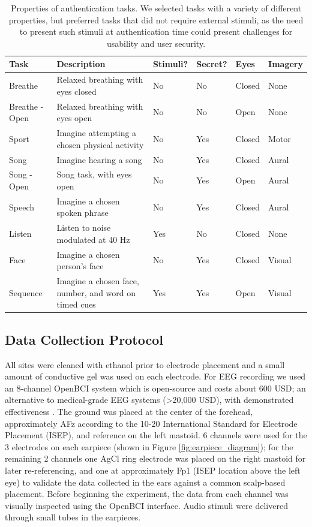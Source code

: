 \documentclass{sigchi}
\begin{document}
\begin{table}[t]
\centering
\begin{tabularx}{\textwidth}{llllll}

\textbf{Task} & \textbf{Description} & \textbf{Stimuli}? & \textbf{Secret}? & \textbf{Eyes} & \textbf{Imagery}\\
\hline
Breathe & Relaxed breathing with eyes closed & No & No & Closed & None\\
Breathe - Open & Relaxed breathing with eyes open & No & No & Open & None\\
Sport & Imagine attempting a chosen physical activity & No & Yes & Closed & Motor\\
Song & Imagine hearing a song & No & Yes & Closed & Aural\\
Song - Open & Song task, with eyes open & No & Yes & Open & Aural\\
Speech & Imagine a chosen spoken phrase & No & Yes & Closed & Aural\\
Listen & Listen to noise modulated at 40 Hz & Yes & No & Closed & None\\
Face & Imagine a chosen person's face & No & Yes & Closed & Visual\\
Sequence & Imagine a chosen face, number, and word on timed cues & Yes & Yes & Open & Visual\\
\hline
\end{tabularx}
\caption{Properties of authentication tasks. We selected tasks with a variety of different properties, but preferred tasks that did not require external stimuli, as the need to present such stimuli at authentication time could present challenges for usability and user security.}
\label{tab:tasks}%
\end{table}

\subsection{Data Collection Protocol}
All sites were cleaned with ethanol prior to electrode placement and a small amount of conductive gel was used on each electrode. For EEG recording we used an 8-channel OpenBCI system \cite{michalska2009openbci} which is open-source and costs about 600 USD; an alternative to medical-grade EEG systems (\textgreater20,000 USD), with demonstrated effectiveness \cite{Frey2016}. The ground was placed at the center of the forehead, approximately AFz according to the 10-20 International Standard for Electrode Placement (ISEP), and reference on the left mastoid. 6 channels were used for the 3 electrodes on each earpiece (shown in Figure \ref{fig:earpiece_diagram}); for the remaining 2 channels one AgCl ring electrode was placed on the right mastoid for later re-referencing, and one at approximately Fp1 (ISEP location above the left eye) to validate the data collected in the ears against a common scalp-based placement. Before beginning the experiment, the data from each channel was visually inspected using the OpenBCI interface. Audio stimuli were delivered through small tubes in the earpieces.
\end{document}
